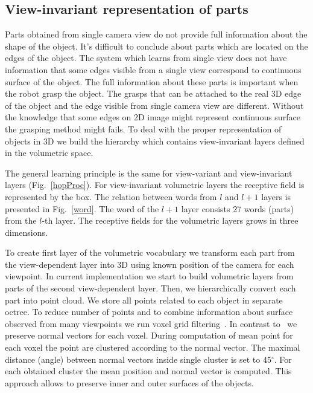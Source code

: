 \documentclass[letterpaper,10pt,conference]{ieeeconf}  %
\begin{document}
\subsection{View-invariant representation of parts}

Parts obtained from single camera view do not provide full information about the shape of the object. It's difficult to conclude about parts which are located on the edges of the object. The system which learns from single view does not have information that some edges visible from a single view correspond to continuous surface of the object. The full information about these parts is important when the robot grasp the object. The grasps that can be attached to the real 3D edge of the object and the edge visible from single camera view are different. Without the knowledge that some edges on 2D image might represent continuous surface the grasping method might fails. To deal with the proper representation of objects in 3D we build the hierarchy which contains view-invariant layers defined in the volumetric space.


The general learning principle is the same for view-variant and view-invariant layers (Fig.~\ref{hopProc}). For view-invariant volumetric layers the receptive field is represented by the box. The relation between words from $l$ and $l+1$ layers is presented in Fig.~\ref{word}. The word of the $l+1$ layer consists 27 words (parts) from the $l$-th layer. The receptive fields for the volumetric layers grows in three dimensions.

To create first layer of the volumetric vocabulary we transform each part from the view-dependent layer into 3D using known position of the camera for each viewpoint. In current implementation we start to build volumetric layers from parts of the second view-dependent layer. Then, we hierarchically convert each part into point cloud. We store all points related to each object in separate octree. To reduce number of points and to combine information about surface observed from many viewpoints we run voxel grid filtering~\cite{Aldoma2012}. In contrast to~\cite{Aldoma2012} we preserve normal vectors for each voxel. During computation of mean point for each voxel the point are clustered according to the normal vector. The maximal distance (angle) between normal vectors inside single cluster is set to 45$^\circ$. For each obtained cluster the mean position and normal vector is computed. This approach allows to preserve inner and outer surfaces of the objects.
\end{document}
